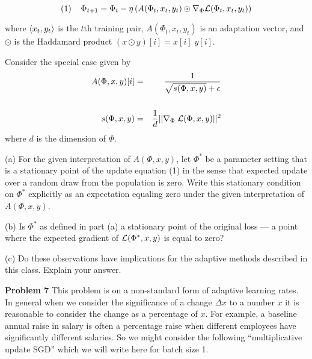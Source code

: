 \documentclass{article}
\newcommand{\solution}[1]{}
\begin{document}
$$(1)\;\;\;\;\Phi_{t+1} = \Phi_t - \eta\left(A(\Phi_t,x_t,y_t)\odot \nabla_\Phi {\cal L}(\Phi_t,x_t,y_t)\right)$$

where ${\mbox{$\langle x_t,y_t\rangle$}}$ is the $t$th training pair, $A(\Phi_t,x_t,y_t)$ is an adaptation vector, and $\odot$ is the Haddamard product $(x \odot y)[i] = x[i]\;y[i]$.

Consider the special case given by
\begin{eqnarray*}
  A(\Phi,x,y)[i] & = & \frac{1}{\sqrt{s(\Phi,x,y)} + \epsilon} \\
  \\
  s(\Phi,x,y) & = & \frac{1}{d} ||\nabla_\Phi\;{\cal L}(\Phi,x,y)||^2 \\
\end{eqnarray*}
where $d$ is the dimension of $\Phi$.
\medskip

(a) For the given interpretation of $A(\Phi,x,y)$, let $\Phi^*$ be a parameter setting that is a stationary point of the update equation (1)
in the sense that expected update over a random draw from the population is zero.  Write this stationary condition
on $\Phi^*$ explicitly as an expectation equaling zero under the given interpretation of $A(\Phi,x,y)$.

\solution{
$$E_{\tuple{x,y} \sim \pop}\;\frac{1}{\sqrt{s(\Phi^*,x,y)+ \epsilon}}\;\nabla_\Phi\;{\cal L}(\Phi,x,y) = 0$$
}

\medskip
(b) Is $\Phi^*$ as defined in part (a) a stationary point of the original loss --- a point where the expected gradient of ${\cal L}(\Phi^*,x,y)$ is equal to zero?

\solution{
  No, the average a weighted sum is different from the average of an unweighted sum
  and hence the fact that the weighted average is zero does not imply that the average is zero.
  }
  
\medskip
(c) Do these observations have implications for the adaptive methods described in this class.  Explain your answer.

\solution{Yes, the example considered here is just a special case of RMSProp or Adam which are in fact not guaranteed to converge to a stationary point (or local optimum) of the loss function.}

\bigskip
{\bf Problem 7}  This problem is on a non-standard form of adaptive learning rates.  In general when we consider the significance of a change $\Delta x$ to a number $x$ it is reasonable to consider
the change as a percentage of $x$.  For example, a baseline annual raise in salary is often a percentage raise when different employees have significantly different salaries.  So we might consider the following
``multiplicative update SGD'' which we will write here for batch size 1.
\end{document}
